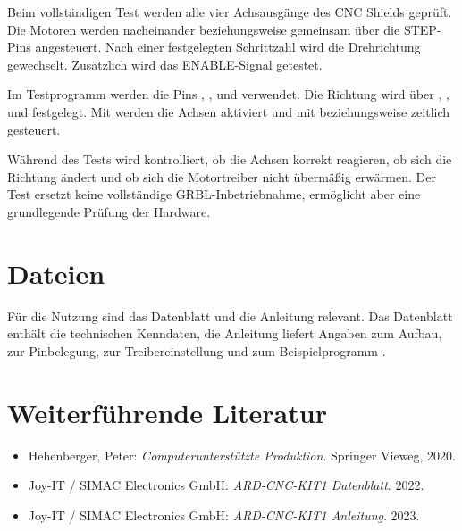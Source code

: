 Beim vollständigen Test werden alle vier Achsausgänge des CNC Shields geprüft. Die Motoren werden nacheinander beziehungsweise gemeinsam über die STEP-Pins angesteuert. Nach einer festgelegten Schrittzahl wird die Drehrichtung gewechselt. Zusätzlich wird das ENABLE-Signal getestet.

Im Testprogramm werden die Pins , ,  und  verwendet. Die Richtung wird über , ,  und  festgelegt. Mit  werden die Achsen aktiviert und mit  beziehungsweise  zeitlich gesteuert.

Während des Tests wird kontrolliert, ob die Achsen korrekt reagieren, ob sich die Richtung ändert und ob sich die Motortreiber nicht übermäßig erwärmen. Der Test ersetzt keine vollständige GRBL-Inbetriebnahme, ermöglicht aber eine grundlegende Prüfung der Hardware.

\section{Dateien}

Für die Nutzung sind das Datenblatt und die Anleitung relevant. Das Datenblatt enthält die technischen Kenndaten, die Anleitung liefert Angaben zum Aufbau, zur Pinbelegung, zur Treibereinstellung und zum Beispielprogramm \cite{JoyIT:CNCShield:Datenblatt}\cite{JoyIT:CNCShield:Anleitung}.

\section{Weiterführende Literatur}

\begin{itemize}
	\item Hehenberger, Peter: \textit{Computerunterstützte Produktion}. Springer Vieweg, 2020. \cite{Hehenberger:2020}
	\item Joy-IT / SIMAC Electronics GmbH: \textit{ARD-CNC-KIT1 Datenblatt}. 2022. \cite{JoyIT:CNCShield:Datenblatt}
	\item Joy-IT / SIMAC Electronics GmbH: \textit{ARD-CNC-KIT1 Anleitung}. 2023. \cite{JoyIT:CNCShield:Anleitung}
\end{itemize}
